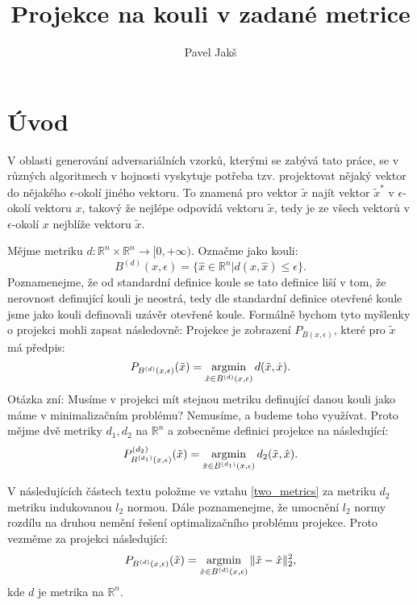 \documentclass[czech]{article}
\author{Pavel Jakš}
\title{Projekce na kouli v zadané metrice}
\begin{document}
\maketitle

\section*{Úvod}

V oblasti generování adversariálních vzorků, kterými se zabývá tato práce, se v různých algoritmech v hojnosti vyskytuje
potřeba tzv. projektovat nějaký vektor do nějakého $\epsilon$-okolí jiného vektoru.
To znamená pro vektor $\tilde{x}$ najít vektor $\tilde{x}^*$ v $\epsilon$-okolí vektoru $x$,
takový že nejlépe odpovídá vektoru $\tilde{x}$, tedy je ze všech vektorů v $\epsilon$-okolí $x$
nejblíže vektoru $\tilde{x}$.

Mějme metriku $d: \mathbb{R}^n \times \mathbb{R}^n \rightarrow [0, + \infty)$.
Označme jako kouli:
\begin{equation}
    B^{(d)} (x, \epsilon) = \{\hat{x} \in \mathbb{R}^n | d(x, \hat{x}) \leq \epsilon\}.
\end{equation}
Poznamenejme, že od standardní definice koule se tato definice liší v tom, že nerovnost definující kouli je neostrá,
tedy dle standardní definice otevřené koule jsme jako kouli definovali uzávěr otevřené koule.
Formálně bychom tyto myšlenky o projekci mohli zapsat následovně:
Projekce je zobrazení $P_{B(x, \epsilon)}$, které pro $\tilde{x}$ má předpis:
\begin{equation}
    P_{B^{(d)} (x, \epsilon)}(\tilde{x}) = \operatornamewithlimits{argmin}_{\hat{x} \in B^{(d)} (x, \epsilon)} d(\tilde{x}, \hat{x}).
\end{equation}
Otázka zní: Musíme v projekci mít stejnou metriku definující danou kouli jako máme v minimalizačním problému?
Nemusíme, a budeme toho využívat.
Proto mějme dvě metriky $d_1, d_2$ na $\mathbb{R}^n$ a zobecněme definici projekce na následující:
\begin{equation} \label{two_metrics}
    P_{B^{(d_1)} (x, \epsilon)}^{(d_2)}(\tilde{x}) = \operatornamewithlimits{argmin}_{\hat{x} \in B^{(d_1)} (x, \epsilon)} d_2(\tilde{x}, \hat{x}).
\end{equation}

V následujících částech textu položme ve vztahu \ref{two_metrics} za metriku $d_2$ metriku indukovanou $l_2$ normou.
Dále poznamenejme, že umocnění $l_2$ normy rozdílu na druhou nemění řešení optimalizačního problému projekce.
Proto vezměme za projekci následující:
\begin{equation}
    P_{B^{(d)} (x, \epsilon)}(\tilde{x}) = \operatornamewithlimits{argmin}_{\hat{x} \in B^{(d)} (x, \epsilon)} \|\tilde{x} - \hat{x}\|_2^2,
\end{equation}
kde $d$ je metrika na $\mathbb{R}^n$.
\end{document}
